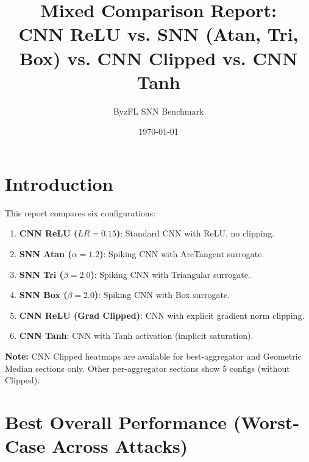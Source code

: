 \documentclass{article}
\title{Mixed Comparison Report:\\CNN ReLU vs. SNN (Atan, Tri, Box) vs. CNN Clipped vs. CNN Tanh}
\author{ByzFL SNN Benchmark}
\date{\today}
\begin{document}
\maketitle

\clearpage
\tableofcontents
\clearpage

\section{Introduction}
This report compares six configurations:
\begin{enumerate}
    \item \textbf{CNN ReLU ($LR=0.15$)}: Standard CNN with ReLU, no clipping.
    \item \textbf{SNN Atan ($\alpha=1.2$)}: Spiking CNN with ArcTangent surrogate.
    \item \textbf{SNN Tri ($\beta=2.0$)}: Spiking CNN with Triangular surrogate.
    \item \textbf{SNN Box ($\beta=2.0$)}: Spiking CNN with Box surrogate.
    \item \textbf{CNN ReLU (Grad Clipped)}: CNN with explicit gradient norm clipping.
    \item \textbf{CNN Tanh}: CNN with Tanh activation (implicit saturation).
\end{enumerate}

\textbf{Note:} CNN Clipped heatmaps are available for best-aggregator and Geometric Median sections only. Other per-aggregator sections show 5 configs (without Clipped).

\clearpage

\section{Best Overall Performance (Worst-Case Across Attacks)}
\end{document}
